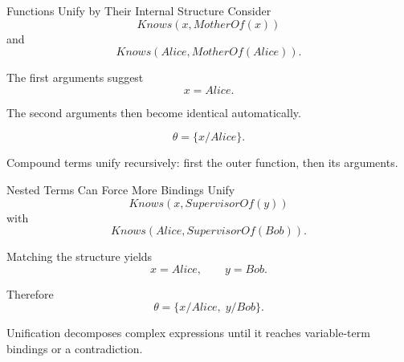 \documentclass[aspectratio=169,10pt]{beamer}
\begin{document}
\begin{frame}[shrink=10]{Functions Unify by Their Internal Structure}
  Consider
  \[
    Knows(x,MotherOf(x))
  \]
  and
  \[
    Knows(Alice,MotherOf(Alice)).
  \]

  The first arguments suggest
  \[
    x=Alice.
  \]

  The second arguments then become identical automatically.

  \[
    \theta = \{x/Alice\}.
  \]

  \begin{keyidea}
    Compound terms unify recursively: first the outer function, then its arguments.
  \end{keyidea}
\end{frame}

\begin{frame}[shrink=10]{Nested Terms Can Force More Bindings}
  Unify
  \[
    Knows(x,SupervisorOf(y))
  \]
  with
  \[
    Knows(Alice,SupervisorOf(Bob)).
  \]

  Matching the structure yields
  \[
    x=Alice,
    \qquad
    y=Bob.
  \]

  Therefore
  \[
    \theta=\{x/Alice,\;y/Bob\}.
  \]

  \begin{keyidea}
    Unification decomposes complex expressions until it reaches variable-term bindings or a contradiction.
  \end{keyidea}
\end{frame}
\end{document}
